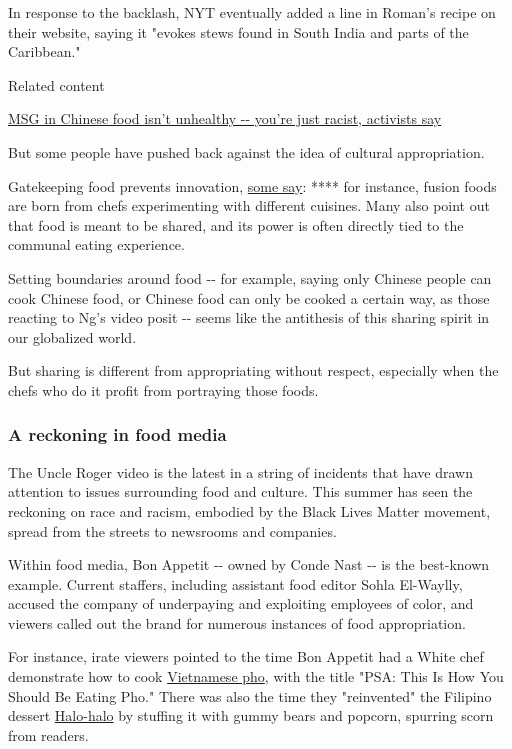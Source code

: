 In response to the backlash, NYT eventually added a line in Roman's
recipe on their website, saying it "evokes stews found in South India
and parts of the Caribbean."

Related content

\href{/2020/01/18/asia/chinese-restaurant-syndrome-msg-intl-hnk-scli/index.html}{MSG
in Chinese food isn't unhealthy -\/- you're just racist, activists say}

But some people have pushed back against the idea of cultural
appropriation.

Gatekeeping food prevents innovation,
\href{https://www.foodrepublic.com/2017/06/01/cultural-appropriation-food/}{some
say}: **** for instance, fusion foods are born from chefs experimenting
with different cuisines. Many also point out that food is meant to be
shared, and its power is often directly tied to the communal eating
experience.

Setting boundaries around food -\/- for example, saying only Chinese
people can cook Chinese food, or Chinese food can only be cooked a
certain way, as those reacting to Ng's video posit -\/- seems like the
antithesis of this sharing spirit in our globalized world.

But sharing is different from appropriating without respect, especially
when the chefs who do it profit from portraying those foods.

\hypertarget{a-reckoning-in-food-media}{%
\subsubsection{A reckoning in food
media}\label{a-reckoning-in-food-media}}

The Uncle Roger video is the latest in a string of incidents that have
drawn attention to issues surrounding food and culture. This summer has
seen the reckoning on race and racism, embodied by the Black Lives
Matter movement, spread from the streets to newsrooms and companies.

Within food media, Bon Appetit -\/- owned by Conde Nast -\/- is the
best-known example. Current staffers, including assistant food editor
Sohla El-Waylly, accused the company of underpaying and exploiting
employees of color, and viewers called out the brand for numerous
instances of food appropriation.

For instance, irate viewers pointed to the time Bon Appetit had a White
chef demonstrate how to cook
\href{https://www.bonappetit.com/story/how-you-should-eating-pho?mbid=social_facebook}{Vietnamese
pho}, with the title "PSA: This Is How You Should Be Eating Pho." There
was also the time they "reinvented" the Filipino dessert
\href{https://www.bonappetit.com/recipe/ode-to-halo-halo}{Halo-halo} by
stuffing it with gummy bears and popcorn, spurring scorn from readers.

